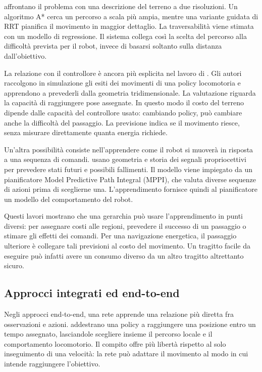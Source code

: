 \citet{Belter2016Adaptive} affrontano il problema con una descrizione del terreno a due risoluzioni. Un algoritmo A* cerca un percorso a scala più ampia, mentre una variante guidata di RRT pianifica il movimento in maggior dettaglio. La traversabilità viene stimata con un modello di regressione. Il sistema collega così la scelta del percorso alla difficoltà prevista per il robot, invece di basarsi soltanto sulla distanza dall'obiettivo.

La relazione con il controllore è ancora più esplicita nel lavoro di \citet{Frey2022PolicyGuided}. Gli autori raccolgono in simulazione gli esiti dei movimenti di una policy locomotoria e apprendono a prevederli dalla geometria tridimensionale. La valutazione riguarda la capacità di raggiungere pose assegnate. In questo modo il costo del terreno dipende dalle capacità del controllore usato: cambiando policy, può cambiare anche la difficoltà del passaggio. La previsione indica se il movimento riesce, senza misurare direttamente quanta energia richiede.

Un'altra possibilità consiste nell'apprendere come il robot si muoverà in risposta a una sequenza di comandi. \citet{Roth2025Forward} usano geometria e storia dei segnali propriocettivi per prevedere stati futuri e possibili fallimenti. Il modello viene impiegato da un pianificatore Model Predictive Path Integral (MPPI), che valuta diverse sequenze di azioni prima di sceglierne una. L'apprendimento fornisce quindi al pianificatore un modello del comportamento del robot.

Questi lavori mostrano che una gerarchia può usare l'apprendimento in punti diversi: per assegnare costi alle regioni, prevedere il successo di un passaggio o stimare gli effetti dei comandi. Per una navigazione energetica, il passaggio ulteriore è collegare tali previsioni al costo del movimento. Un tragitto facile da eseguire può infatti avere un consumo diverso da un altro tragitto altrettanto sicuro.

\subsection{Approcci integrati ed end-to-end}

Negli approcci end-to-end, una rete apprende una relazione più diretta fra osservazioni e azioni. \citet{Rudin2022Advanced} addestrano una policy a raggiungere una posizione entro un tempo assegnato, lasciandole scegliere insieme il percorso locale e il comportamento locomotorio. Il compito offre più libertà rispetto al solo inseguimento di una velocità: la rete può adattare il movimento al modo in cui intende raggiungere l'obiettivo.

